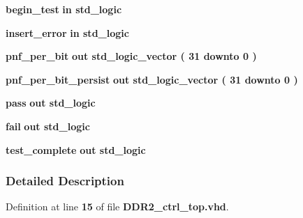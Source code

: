 \begin{DoxyCompactItemize}
\item 
{\bf begin\+\_\+test}  {\bfseries {\bfseries \textcolor{keywordflow}{in}\textcolor{vhdlchar}{ }}} {\bfseries \textcolor{comment}{std\+\_\+logic}\textcolor{vhdlchar}{ }} 
\item 
{\bf insert\+\_\+error}  {\bfseries {\bfseries \textcolor{keywordflow}{in}\textcolor{vhdlchar}{ }}} {\bfseries \textcolor{comment}{std\+\_\+logic}\textcolor{vhdlchar}{ }} 
\item 
{\bf pnf\+\_\+per\+\_\+bit}  {\bfseries {\bfseries \textcolor{keywordflow}{out}\textcolor{vhdlchar}{ }}} {\bfseries \textcolor{comment}{std\+\_\+logic\+\_\+vector}\textcolor{vhdlchar}{ }\textcolor{vhdlchar}{(}\textcolor{vhdlchar}{ }\textcolor{vhdlchar}{ } \textcolor{vhdldigit}{31} \textcolor{vhdlchar}{ }\textcolor{keywordflow}{downto}\textcolor{vhdlchar}{ }\textcolor{vhdlchar}{ } \textcolor{vhdldigit}{0} \textcolor{vhdlchar}{ }\textcolor{vhdlchar}{)}\textcolor{vhdlchar}{ }} 
\item 
{\bf pnf\+\_\+per\+\_\+bit\+\_\+persist}  {\bfseries {\bfseries \textcolor{keywordflow}{out}\textcolor{vhdlchar}{ }}} {\bfseries \textcolor{comment}{std\+\_\+logic\+\_\+vector}\textcolor{vhdlchar}{ }\textcolor{vhdlchar}{(}\textcolor{vhdlchar}{ }\textcolor{vhdlchar}{ } \textcolor{vhdldigit}{31} \textcolor{vhdlchar}{ }\textcolor{keywordflow}{downto}\textcolor{vhdlchar}{ }\textcolor{vhdlchar}{ } \textcolor{vhdldigit}{0} \textcolor{vhdlchar}{ }\textcolor{vhdlchar}{)}\textcolor{vhdlchar}{ }} 
\item 
{\bf pass}  {\bfseries {\bfseries \textcolor{keywordflow}{out}\textcolor{vhdlchar}{ }}} {\bfseries \textcolor{comment}{std\+\_\+logic}\textcolor{vhdlchar}{ }} 
\item 
{\bf fail}  {\bfseries {\bfseries \textcolor{keywordflow}{out}\textcolor{vhdlchar}{ }}} {\bfseries \textcolor{comment}{std\+\_\+logic}\textcolor{vhdlchar}{ }} 
\item 
{\bf test\+\_\+complete}  {\bfseries {\bfseries \textcolor{keywordflow}{out}\textcolor{vhdlchar}{ }}} {\bfseries \textcolor{comment}{std\+\_\+logic}\textcolor{vhdlchar}{ }} 
\end{DoxyCompactItemize}


\subsubsection{Detailed Description}


Definition at line {\bf 15} of file {\bf D\+D\+R2\+\_\+ctrl\+\_\+top.\+vhd}.



